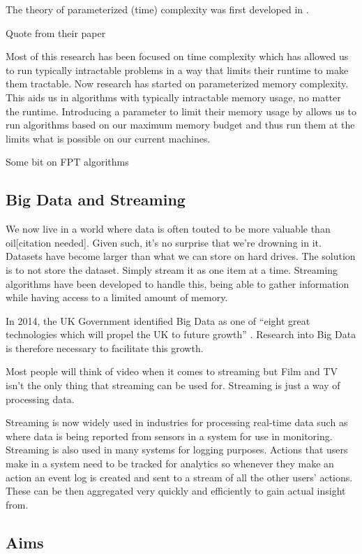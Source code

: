 The theory of parameterized (time) complexity was first developed in
\cite{downey1999parameterized}.

Quote from their paper

Most of this research has been focused on time complexity which has
allowed us to run typically intractable problems in a way that limits
their runtime to make them tractable. Now research has started on
parameterized memory complexity. This aids us in algorithms with
typically intractable memory usage, no matter the runtime. Introducing a
parameter to limit their memory usage by allows us to run algorithms
based on our maximum memory budget and thus run them at the limits what
is possible on our current machines.

Some bit on FPT algorithms

\subsection{Big Data and Streaming}

We now live in a world where data is often touted to be more valuable than oil[citation needed]. Given
such, it's no surprise that we're drowning in it. Datasets have become
larger than what we can store on hard drives. The solution is to not
store the dataset. Simply stream it as one item at a time. Streaming
algorithms have been developed to handle this, being able to gather
information while having access to a limited amount of memory.

In 2014, the UK Government identified Big Data as one of ``eight great
technologies which will propel the UK to future growth''
\cite{intellectualpropertyoffice2014}. Research into Big Data is
therefore necessary to facilitate this growth.

Most people will think of video when it comes to streaming but Film and TV isn't the only thing
that streaming can be used for. Streaming is just a way of processing data.

Streaming is now widely used in industries for processing real-time data such as where data is being reported
from sensors in a system for use in monitoring. Streaming is also used
in many systems for logging purposes. Actions that users make in a
system need to be tracked for analytics so whenever they make an action
an event log is created and sent to a stream of all the other users'
actions. These can be then aggregated very quickly and efficiently to
gain actual insight from.

\subsection{Aims}

